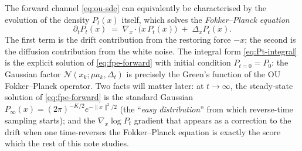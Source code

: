 \documentclass[11pt]{article}
\theoremstyle{definition}
\newcommand{\Detl}{\Delta_t}
\begin{document}
\begin{bayesianview}
The forward channel \eqref{eq:ou-sde} can equivalently be characterised
by the evolution of the density \(P_t(x)\) itself, which solves the
\emph{Fokker--Planck equation} \citep{Oksendal2003}
\begin{equation}\label{eq:fpe-forward}
    \partial_t P_t(x)
    \;=\;
    \nabla_x \cdot \bigl(x\, P_t(x)\bigr)
    \;+\;
    \Delta_x P_t(x).
\end{equation}
The first term is the drift contribution from the restoring force
\(-x\); the second is the diffusion contribution from the white noise.
The integral form \eqref{eq:Pt-integral} is the explicit solution of
\eqref{eq:fpe-forward} with initial condition
\(P_{t = 0} = P_0\): the Gaussian factor
\(\mathcal N(x_k; \mu a_k, \Detl)\) is precisely the Green's function
of the OU Fokker--Planck operator. Two facts will matter later: at
\(t \to \infty\), the steady-state solution of \eqref{eq:fpe-forward}
is the standard Gaussian
\(P_{\infty}(x) = (2 \pi)^{-K/2} e^{-\|x\|^2 / 2}\) (the
``\emph{easy distribution}'' from which reverse-time sampling
starts); and the \(\nabla_x \log P_t\) gradient that appears as a
correction to the drift when one time-reverses the Fokker--Planck
equation is exactly the score \citep{Anderson1982} which the rest of this note studies.
\end{bayesianview}
\end{document}
